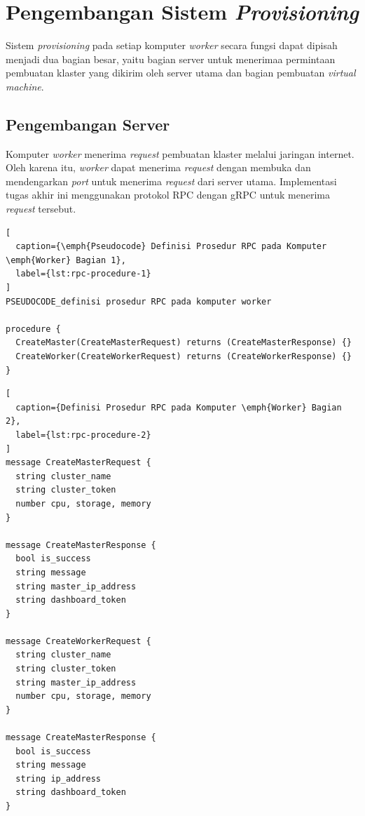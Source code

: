 \section{Pengembangan Sistem \emph{Provisioning}}
\label{sec:implementasi-sistem-provisioning}

Sistem \emph{provisioning} pada setiap komputer \emph{worker} secara fungsi dapat dipisah
menjadi dua bagian besar, yaitu bagian server untuk menerimaa permintaan pembuatan klaster yang dikirim
oleh server utama dan bagian pembuatan \emph{virtual machine}.

\subsection{Pengembangan Server}
\label{sec:server}

Komputer \emph{worker} menerima \emph{request} pembuatan klaster melalui jaringan internet.
Oleh karena itu, \emph{worker} dapat menerima \emph{request} dengan membuka dan mendengarkan \emph{port}
untuk menerima \emph{request} dari server utama. Implementasi tugas akhir ini menggunakan protokol
RPC dengan gRPC untuk menerima \emph{request} tersebut.

\begin{lstlisting}[
  caption={\emph{Pseudocode} Definisi Prosedur RPC pada Komputer \emph{Worker} Bagian 1},
  label={lst:rpc-procedure-1}
]
PSEUDOCODE_definisi prosedur RPC pada komputer worker

procedure {
  CreateMaster(CreateMasterRequest) returns (CreateMasterResponse) {}
  CreateWorker(CreateWorkerRequest) returns (CreateWorkerResponse) {}
}
\end{lstlisting}

\begin{lstlisting}[
  caption={Definisi Prosedur RPC pada Komputer \emph{Worker} Bagian 2},
  label={lst:rpc-procedure-2}
]
message CreateMasterRequest {
  string cluster_name
  string cluster_token
  number cpu, storage, memory
}

message CreateMasterResponse {
  bool is_success
  string message
  string master_ip_address
  string dashboard_token
}

message CreateWorkerRequest {
  string cluster_name
  string cluster_token
  string master_ip_address
  number cpu, storage, memory
}

message CreateMasterResponse {
  bool is_success
  string message
  string ip_address
  string dashboard_token
}
\end{lstlisting}

